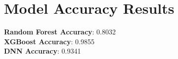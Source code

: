 \section*{Model Accuracy Results}
\textbf{Random Forest Accuracy}: 0.8032\\
\textbf{XGBoost Accuracy}: 0.9855\\
\textbf{DNN Accuracy}: 0.9341\\

